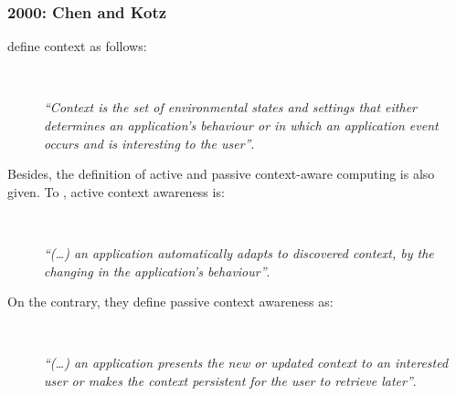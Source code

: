 \subsubsection{2000: Chen and Kotz}
\label{sec:chen}

\citet{chen_survey_2000} define context as follows: 

\newpage

\begin{description}
  \item[] \hfill \\
  \begin{mdframed}[hidealllines=true,backgroundcolor=gray!20]
  \textit{``Context is the set of environmental states and settings that either 
  determines an application’s behaviour or in which an application event occurs 
  and is interesting to the user''}.
  \end{mdframed}
\end{description}

Besides, the definition of active and passive context-aware computing is also 
given. To \citeauthor{chen_survey_2000}, active context awareness is:

\begin{description}
  \item[] \hfill \\
  \begin{mdframed}[hidealllines=true,backgroundcolor=gray!20]
  \textit{``(\dots) an application automatically adapts to discovered context, by the 
  changing in the application's behaviour''}.
  \end{mdframed}
\end{description}

On the contrary, they define passive context awareness as:

\begin{description}
  \item[] \hfill \\
  \begin{mdframed}[hidealllines=true,backgroundcolor=gray!20]
  \textit{``(\dots) an application presents the new or updated context to an interested
  user or makes the context persistent for the user to retrieve later''}.
  \end{mdframed}
\end{description}

